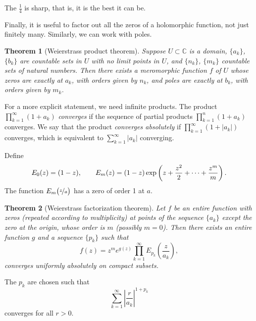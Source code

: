 \documentclass[12pt,openany]{book}
\newcommand{\avoidbreak}{\postdisplaypenalty=100}
\newcommand{\sabs}[1]{\lvert {#1} \rvert}
\newcommand{\abs}[1]{\left\lvert {#1} \right\rvert}
\newcommand{\C}{{\mathbb{C}}}
\theoremstyle{plain}
\newtheorem{thm}{Theorem}[section]
\theoremstyle{remark}
\theoremstyle{definition}
\theoremstyle{exercise}
\theoremstyle{example}
\begin{document}
The $\frac{1}{4}$ is sharp, that is, it is the best it can be.

\medskip

Finally, it is useful to factor out all the zeros of a holomorphic function,
not just finitely many.  Similarly, we can work with poles.

\begin{thm}[Weierstrass product theorem]
Suppose $U \subset \C$ is a domain, $\{ a_k \}$, $\{ b_k \}$ are
countable sets in $U$
with no limit points in $U$, and $\{ n_k \}$, $\{ m_k \}$ countable sets of
natural numbers.
Then there exists a meromorphic function $f$ of $U$ whose
zeros are exactly at $a_k$, with orders given by $n_k$, and
poles are exactly at $b_k$, with orders given by $m_k$.
\end{thm}

For a more explicit statement, we need infinite products.  The product
$\prod_{k=1}^\infty (1+a_k)$
\emph{converges} if the sequence of partial products
$\prod_{k=1}^n (1+a_k)$ converges.  We say that the product
\emph{converges absolutely} if
$\prod_{k=1}^\infty (1+\sabs{a_k})$
converges, which is equivalent to $\sum_{k=1}^\infty \sabs{a_k}$ converging.

Define
\begin{equation*}
E_0(z) = (1-z), \qquad
E_m(z) = (1-z) \exp\left( z +\frac{z^2}{2} + \cdots + \frac{z^m}{m} \right)
.
\avoidbreak
\end{equation*}
The function $E_m\bigl(\nicefrac{z}{a}\bigr)$ has a zero of order 1 at $a$.

\begin{thm}[Weierstrass factorization theorem]
Let $f$ be an entire function with zeros (repeated according to multiplicity) at points of
the sequence $\{ a_k \}$ except the zero at
the origin, whose order is $m$ (possibly $m=0$).  Then there exists an
entire function $g$ and a sequence $\{ p_k \}$ such that
\begin{equation*}
f(z) = z^m e^{g(z)} \prod_{k=1}^\infty E_{p_k}\left(\frac{z}{a_k}\right) ,
\end{equation*}
converges uniformly absolutely on compact subsets.
\end{thm}

The $p_k$ are chosen such that
\begin{equation*}
\sum_{k=1}^\infty {\abs{\frac{r}{a_k}}}^{1+p_k}
\end{equation*}
converges for all $r > 0$.
\end{document}

